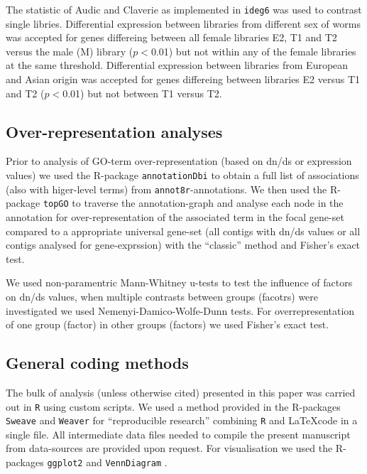 \documentclass[10pt]{bmc_article}
\newenvironment{bmcformat}{\begin{raggedright}\baselineskip20pt\sloppy\setboolean{publ}{false}}{\end{raggedright}\baselineskip20pt\sloppy}
\begin{document}
\begin{bmcformat}

The statistic of Audic and Claverie \cite{pmid9331369} as implemented
in \texttt{ideg6} \cite{pmid12429865} was used to contrast single
libries. Differential expression between libraries from different sex
of worms was accepted for genes differeing between all female
libraries E2, T1 and T2 versus the male (M) library ($p<$0.01) but not
within any of the female libraries at the same threshold. Differential
expression between libraries from European and Asian origin was
accepted for genes differeing between libraries E2 versus T1 and T2
($p<$0.01) but not between T1 versus T2.

\subsection*{Over-representation analyses}

Prior to analysis of GO-term over-representation (based on dn/ds or
expression values) we used the R-package \texttt{annotationDbi}
\cite{AnnotationDbi} to obtain a full list of associations (also with
higer-level terms) from \texttt{annot8r}-annotations. We then used the
R-package \texttt{topGO} \cite{topGO} to traverse the annotation-graph
and analyse each node in the annotation for over-representation of the
associated term in the focal gene-set compared to a appropriate
universal gene-set (all contigs with dn/ds values or all contigs
analysed for gene-exprssion) with the ``classic'' method and Fisher's
exact test.

We used non-paramentric Mann-Whitney u-tests to test the influence of
factors on dn/ds values, when multiple contrasts between groups
(facotrs) were investigated we used Nemenyi-Damico-Wolfe-Dunn
tests. For overrepresentation of one group (factor) in other groups
(factors) we used Fisher's exact test.

\subsection*{General coding methods}

The bulk of analysis (unless otherwise cited) presented in this paper
was carried out in \texttt{R} \cite{R_project} using custom
scripts. We used a method provided in the R-packages \texttt{Sweave}
\cite{lmucs-papers:Leisch:2002} and \texttt{Weaver} \cite{weaver} for
``reproducible research'' combining \texttt{R} and \LaTeX code in a
single file. All intermediate data files needed to compile the present
manuscript from data-sources are provided upon request. For
visualisation we used the R-packages \texttt{ggplot2}
\cite{ggplot-book} and \texttt{VennDiagram} \cite{pmid21269502}.



\end{bmcformat}
\end{document}
